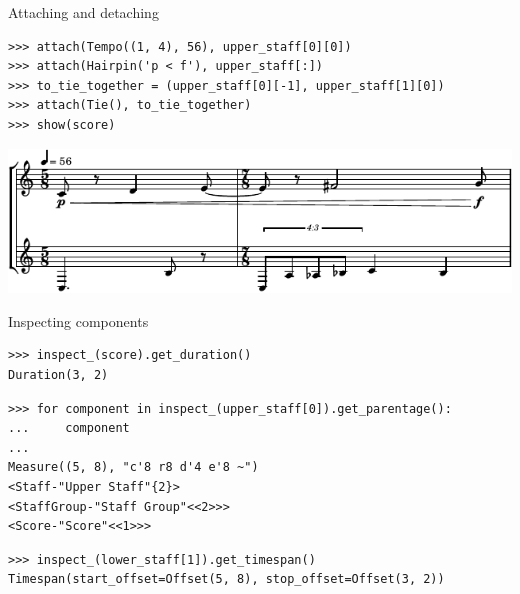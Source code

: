 \begin{frame}[fragile]{Attaching and detaching}

\begin{abjadbookoutput}
\begin{singlespacing}
\vspace{-0.5\baselineskip}
\begin{verbatim}
>>> attach(Tempo((1, 4), 56), upper_staff[0][0])
>>> attach(Hairpin('p < f'), upper_staff[:])
>>> to_tie_together = (upper_staff[0][-1], upper_staff[1][0])
>>> attach(Tie(), to_tie_together)
>>> show(score)
\end{verbatim}
\noindent\includegraphics[max width=\textwidth,]{assets/lilypond-93a2b38978bbd78fc9e299d85430127a.pdf}
\end{singlespacing}
\end{abjadbookoutput}

\end{frame}

\begin{frame}[fragile]{Inspecting components}

\begin{abjadbookoutput}
\begin{singlespacing}
\vspace{-0.5\baselineskip}
\begin{verbatim}
>>> inspect_(score).get_duration()
Duration(3, 2)
\end{verbatim}
\begin{verbatim}
>>> for component in inspect_(upper_staff[0]).get_parentage():
...     component
...
Measure((5, 8), "c'8 r8 d'4 e'8 ~")
<Staff-"Upper Staff"{2}>
<StaffGroup-"Staff Group"<<2>>>
<Score-"Score"<<1>>>
\end{verbatim}
\begin{verbatim}
>>> inspect_(lower_staff[1]).get_timespan()
Timespan(start_offset=Offset(5, 8), stop_offset=Offset(3, 2))
\end{verbatim}
\end{singlespacing}
\end{abjadbookoutput}

\end{frame}


